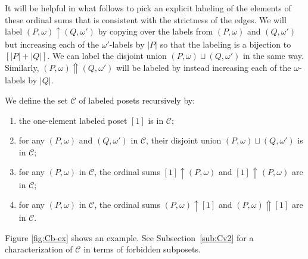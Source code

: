 \documentclass[ALCO,Unicode,published]{cedram}
\newcommand{\om}{\omega}
\newcommand{\Cb}{\mathcal{C}}
\newcommand{\wP}{\uparrow}
\newcommand{\sP}{\Uparrow}
\begin{document}
It will be helpful in what follows to pick an explicit labeling of the elements of these ordinal sums that is consistent with the strictness of the edges.  We will label $(P,\om)\wP (Q,\om')$ by copying over the labels from $(P,\om)$ and $(Q,\om')$ but increasing each of the $\om'$-labels by $|P|$ so that the labeling is a bijection to $[|P|+|Q|]$.  We can label the disjoint union $(P,\om)\sqcup (Q,\om')$ in the same way.  Similarly, $(P,\om)\sP (Q,\om')$ will be labeled by instead increasing each of the $\om$-labels by $|Q|$.

\begin{definition}\label{def:C}
We define the set $\Cb$ of labeled posets recursively by:
\begin{enumerate}[label=(\alph*)]
\item\label{it42a} the one-element labeled poset $[1]$ is in $\Cb$;
\item \label{it42b} for any $(P,\om)$ and $(Q,\om')$ in $\Cb$, their disjoint union $(P,\om)\sqcup (Q,\om')$ is in $\Cb$;
\item \label{it42c} for any $(P,\om)$ in $\Cb$, the ordinal sums
$[1]\wP (P,\om)$ and $[1]\sP (P,\om)$
are in $\Cb$;
\item \label{it42d} for any $(P,\om)$ in $\Cb$, the ordinal sums
$(P,\om)\wP [1]$ and $(P,\om)\sP [1]$ 
are in $\Cb$.
\end{enumerate} 
\end{definition}
Figure \ref{fig:Cb-ex} shows an example.  See Subsection~\ref{sub:Cv2} for a characterization of $\Cb$ in terms of forbidden subposets.
\end{document}
